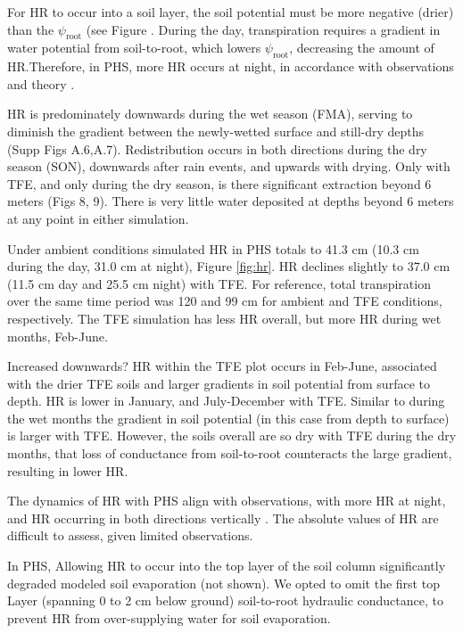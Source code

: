 \documentclass[draft,linenumbers]{agujournal}
\begin{document}
    
    For HR to occur into a soil layer, the soil potential must be more negative (drier) than the $\psi_{\text{root}}$ (see Figure . During the day, transpiration requires a gradient in water potential from soil-to-root, which lowers $\psi_{\text{root}}$, decreasing the amount of HR.Therefore, in PHS, more HR occurs at night, in accordance with observations and theory \citep{oliveira2005,lee2005}.
    
    HR is predominately downwards during the wet season (FMA), serving to diminish the gradient between the newly-wetted surface and still-dry depths (Supp Figs A.6,A.7). Redistribution occurs in both directions during the dry season (SON), downwards after rain events, and upwards with drying. Only with TFE, and only during the dry season, is there significant extraction beyond 6 meters (Figs 8, 9). There is very little water deposited at depths beyond 6 meters at any point in either simulation.
    
    Under ambient conditions simulated HR in PHS totals to 41.3 cm (10.3 cm during the day, 31.0 cm at night), Figure \ref{fig:hr}. HR declines slightly to 37.0 cm (11.5 cm day and 25.5 cm night) with TFE. For reference, total transpiration over the same time period was 120 and 99 cm for ambient and TFE conditions, respectively. The TFE simulation has less HR overall, but more HR during wet months, Feb-June.
    
    Increased downwards? HR within the TFE plot occurs in Feb-June, associated with the drier TFE soils and larger gradients in soil potential from surface to depth. HR is lower in January, and July-December with TFE. Similar to during the wet months the gradient in soil potential (in this case from depth to surface) is larger with TFE. However, the soils overall are so dry with TFE during the dry months, that loss of conductance from soil-to-root counteracts the large gradient, resulting in lower HR.
    
    The dynamics of HR with PHS align with observations, with more HR at night, and HR occurring in both directions vertically \citep{burgess1998}.
    The absolute values of HR are difficult to assess, given limited observations.
    
    In PHS, Allowing HR to occur into the top layer of the soil column significantly degraded modeled soil evaporation (not shown). We opted to omit the first top Layer (spanning 0 to 2 cm below ground) soil-to-root hydraulic conductance, to prevent HR from over-supplying water for soil evaporation.
    
\end{document}
